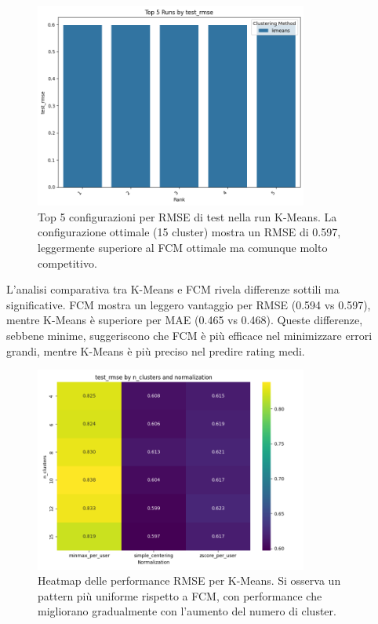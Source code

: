 \begin{figure}[h]
\centering
\includegraphics[width=0.8\textwidth]{output/run_kmeans/images/comparison/test_rmse/barplot_top_5_test_rmse.png}
\caption{Top 5 configurazioni per RMSE di test nella run K-Means. La configurazione ottimale (15 cluster) mostra un RMSE di 0.597, leggermente superiore al FCM ottimale ma comunque molto competitivo.}
\label{fig:kmeans_rmse_top5}
\end{figure}

L'analisi comparativa tra K-Means e FCM rivela differenze sottili ma significative. FCM mostra un leggero vantaggio per RMSE (0.594 vs 0.597), mentre K-Means è superiore per MAE (0.465 vs 0.468). Queste differenze, sebbene minime, suggeriscono che FCM è più efficace nel minimizzare errori grandi, mentre K-Means è più preciso nel predire rating medi.

\begin{figure}[h]
\centering
\includegraphics[width=0.8\textwidth]{output/run_kmeans/images/comparison/test_rmse/heatmap_test_rmse.png}
\caption{Heatmap delle performance RMSE per K-Means. Si osserva un pattern più uniforme rispetto a FCM, con performance che migliorano gradualmente con l'aumento del numero di cluster.}
\label{fig:kmeans_rmse_heatmap}
\end{figure}

